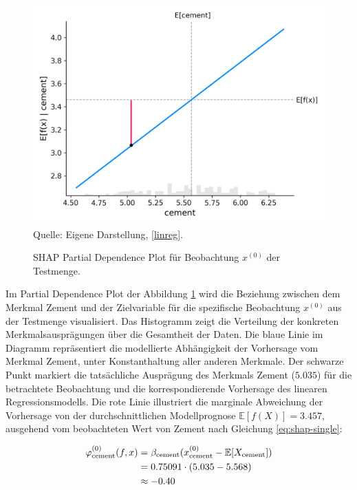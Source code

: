 \begin{figure}[!h]
    \caption{SHAP Partial Dependence Plot für Beobachtung $x^{(0)}$ der Testmenge.}
    \includegraphics[width=1\textwidth]{../scripts/images/shap_dependence_plot.png}
    Quelle: Eigene Darstellung, \ref{linreg}.
    \label{pic:shap_dependence}
\end{figure}

Im Partial Dependence Plot der Abbildung \ref{pic:shap_dependence} wird die Beziehung zwischen 
dem Merkmal Zement und der Zielvariable für die spezifische Beobachtung $x^{(0)}$ aus der Testmenge visualisiert. 
Das Histogramm zeigt die Verteilung der konkreten Merkmalsausprägungen über die Gesamtheit der Daten.
Die blaue Linie im Diagramm repräsentiert die modellierte Abhängigkeit der Vorhersage vom Merkmal Zement, 
unter Konstanthaltung aller anderen Merkmale. Der schwarze Punkt markiert die tatsächliche Ausprägung des 
Merkmals Zement ($5.035$) für die betrachtete Beobachtung und die korrespondierende Vorhersage 
des linearen Regressionsmodells. Die rote Linie illustriert die marginale Abweichung der Vorhersage 
von der durchschnittlichen Modellprognose $\mathbb{E}[f(X)] = 3.457$, ausgehend vom 
beobachteten Wert von Zement nach Gleichung \ref{eq:shap-single}:

\begin{align}
    \label{eq:shap0}
    \varphi_{\text{cement}}^{(0)}(f, x) &= \beta_{\text{cement}} (x_{\text{cement}}^{(0)} - \mathbb{E}[X_{\text{cement}}]) \\ \notag
                        &= 0.75091 \cdot (5.035 - 5.568) \\ \notag
                        &\approx -0.40
\end{align}

